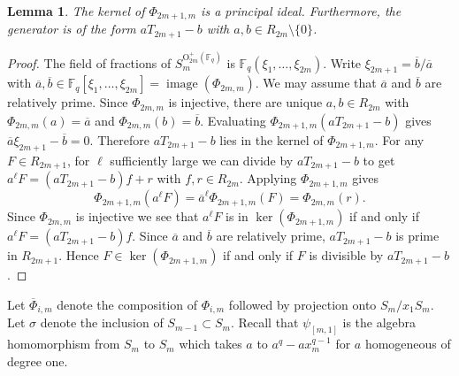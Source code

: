 \documentclass{amsart}
\newcommand{\field}{\mathbb{F}}
\newcommand{\orthp}[2]{{{\text{O}^{+}_{{#1}}(\field_{#2})}}}
\newtheorem{lem}[subsection]{Lemma}
\DeclareMathOperator{\image}{image}
\begin{document}
\begin{lem} The kernel of $\Phi_{2m+1,m}$ is a principal ideal. Furthermore, the generator is of the form $aT_{2m+1}-b$ with $a,b\in R_{2m}\setminus\{0\}$.
\end{lem}
\begin{proof} 
The field of fractions of $S_m^{\orthp{2m}{q}}$ is $\field_q(\xi_1,\ldots,\xi_{2m})$. Write $\xi_{2m+1}=\overline{b}/\overline{a}$ with 
$\overline{a},\overline{b}\in\field_q[\xi_1,\ldots,\xi_{2m}]=\image(\Phi_{2m,m})$.
We may assume that $\overline{a}$ and $\overline{b}$ are relatively prime. Since $\Phi_{2m,m}$ is injective, there are unique $a,b\in R_{2m}$ with
$\Phi_{2m,m}(a)=\overline{a}$ and   $\Phi_{2m,m}(b)=\overline{b}$. Evaluating $\Phi_{2m+1,m}(aT_{2m+1}-b)$ gives $\overline{a}\xi_{2m+1}-\overline{b}=0$.
Therefore $aT_{2m+1}-b$ lies in the kernel of $\Phi_{2m+1,m}$. 
For any $F\in R_{2m+1}$, for $\ell$ sufficiently large we can divide by $aT_{2m+1}-b$ to get $a^{\ell}F=(aT_{2m+1}-b)f+r$ with $f,r\in R_{2m}$.
Applying $\Phi_{2m+1,m}$ gives $$\Phi_{2m+1,m}(a^{\ell}F)=\overline{a}^\ell\Phi_{2m+1,m}(F)=\Phi_{2m,m}(r).$$
Since $\Phi_{2m,m}$ is injective we see that $a^{\ell}F$ is in
$\ker(\Phi_{2m+1,m})$ if and only if $a^{\ell}F=(aT_{2m+1}-b)f$.
Since $\overline{a}$ and $\overline{b}$ are relatively prime, $aT_{2m+1}-b$ is prime in $R_{2m+1}$.   Hence $F\in\ker(\Phi_{2m+1,m})$ if and only if $F$ is divisible by $aT_{2m+1}-b$. 
\end{proof} 

Let $\overline{\Phi}_{i,m}$ denote the composition of $\Phi_{i,m}$ followed by projection onto $S_m/x_1S_m$. 
Let $\sigma$ denote the inclusion of $S_{m-1} \subset S_m$.
Recall that $\psi_{[m,1]}$ is the algebra homomorphism from $S_m$ to $S_m$ which takes $a$ to $a^q-ax_m^{q-1}$ for $a$ homogeneous of degree one.
\end{document}
